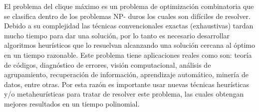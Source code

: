 

El  problema  del  clique  máximo  es  un  problema  de  optimización  combinatoria  que  se  clasifica dentro de los problemas NP- duros los cuales son difíciles de resolver. Debido a su complejidad las técnicas convencionales exactas (exhaustivas) tardan mucho tiempo para dar una solución, por lo tanto es necesario desarrollar algoritmos heurísticos que lo resuelvan  alcanzando  una  solución  cercana  al  óptimo  en  un  tiempo  razonable.  Este  problema tiene aplicaciones reales como son: teoría de códigos, diagnóstico de errores, visión   computacional,   análisis   de   agrupamiento,   recuperación   de   información,   aprendizaje automático, minería de datos, entre  otras.    Por  esta  razón  es  importante  usar  nuevas técnicas heurísticas y/o metaheurísticas para tratar de resolver este problema, las cuales obtengan mejores resultados en un tiempo polinomial. 



